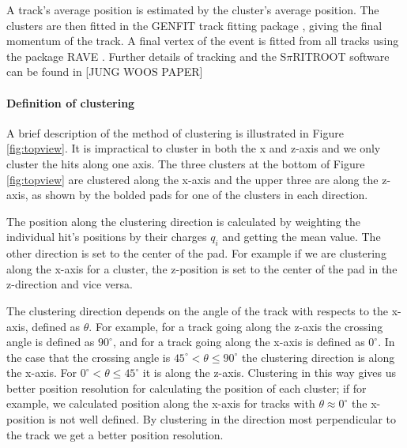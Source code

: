 \documentclass[review]{elsarticle}
\begin{document}
 A track's average position is estimated by the cluster's average position. The clusters are then fitted in the GENFIT track fitting package \cite{genfit}, giving the final momentum of the track. A final vertex of the event is fitted from all tracks using the package RAVE \cite{rave}. Further details of tracking and the S$\pi$RITROOT software can be found in [JUNG WOOS PAPER]
 

\paragraph{Definition of clustering}

A brief description of the method of clustering is illustrated in Figure \ref{fig:topview}. It is impractical to cluster in both the x and z-axis and we only cluster the hits along one axis. The three clusters at the bottom of Figure \ref{fig:topview} are clustered along the x-axis and the upper three are along the z-axis, as shown by the bolded pads for one of the clusters in each direction.



 The position along the clustering direction is calculated by weighting the individual hit's positions by their charges $q_i$ and getting the mean value. The other direction is set to the center of the pad. For example if we are clustering along the x-axis for a cluster, the z-position is set to the center of the pad in the z-direction and vice versa. 
 
 The clustering direction depends on the angle  of the track with respects to the x-axis, defined as $\theta$. For example, for a track going along the z-axis the crossing angle is defined as $90^{\circ}$, and for a track going along the x-axis is defined as $0^{\circ}$. In the case that the crossing angle is $45^{\circ} < \theta \leq 90^{\circ} $ the clustering direction is along the x-axis. For $0^{\circ} < \theta \leq 45^{\circ}$ it is along the z-axis. Clustering in this way gives us better position resolution for calculating the position of each cluster; if  for example, we calculated position along the x-axis for tracks with $\theta \approx 0^{\circ}$ the x-position is not well defined. By clustering in the direction most perpendicular to the track we get a better position resolution.
\end{document}
